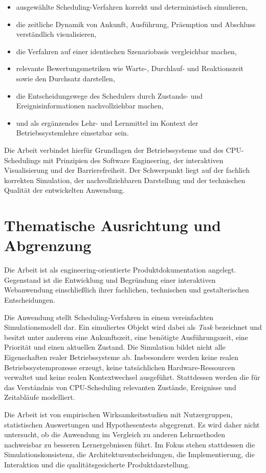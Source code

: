 \begin{itemize}
    \item ausgewählte Scheduling-Verfahren korrekt und deterministisch simulieren,
    \item die zeitliche Dynamik von Ankunft, Ausführung, Präemption und Abschluss verständlich visualisieren,
    \item die Verfahren auf einer identischen Szenariobasis vergleichbar machen,
    \item relevante Bewertungsmetriken wie Warte-, Durchlauf- und Reaktionszeit sowie den Durchsatz darstellen,
    \item die Entscheidungswege des Schedulers durch Zustands- und Ereignisinformationen nachvollziehbar machen,
    \item und als ergänzendes Lehr- und Lernmittel im Kontext der Betriebssystemlehre einsetzbar sein.
\end{itemize}

Die Arbeit verbindet hierfür Grundlagen der Betriebssysteme und des CPU-Schedulings mit Prinzipien des Software Engineering, der interaktiven Visualisierung und der Barrierefreiheit. Der Schwerpunkt liegt auf der fachlich korrekten Simulation, der nachvollziehbaren Darstellung und der technischen Qualität der entwickelten Anwendung.

\section{Thematische Ausrichtung und Abgrenzung}

Die Arbeit ist als engineering-orientierte Produktdokumentation angelegt. Gegenstand ist die Entwicklung und Begründung einer interaktiven Webanwendung einschließlich ihrer fachlichen, technischen und gestalterischen Entscheidungen.

Die Anwendung stellt Scheduling-Verfahren in einem vereinfachten Simulationsmodell dar. Ein simuliertes Objekt wird dabei als \textit{Task} bezeichnet und besitzt unter anderem eine Ankunftszeit, eine benötigte Ausführungszeit, eine Priorität und einen aktuellen Zustand. Die Simulation bildet nicht alle Eigenschaften realer Betriebssysteme ab. Insbesondere werden keine realen Betriebssystemprozesse erzeugt, keine tatsächlichen Hardware-Ressourcen verwaltet und keine realen Kontextwechsel ausgeführt. Stattdessen werden die für das Verständnis von CPU-Scheduling relevanten Zustände, Ereignisse und Zeitabläufe modelliert.

Die Arbeit ist von empirischen Wirksamkeitsstudien mit Nutzergruppen, statistischen Auswertungen und Hypothesentests abgegrenzt. Es wird daher nicht untersucht, ob die Anwendung im Vergleich zu anderen Lehrmethoden nachweisbar zu besseren Lernergebnissen führt. Im Fokus stehen stattdessen die Simulationskonsistenz, die Architekturentscheidungen, die Implementierung, die Interaktion und die qualitätsgesicherte Produktdarstellung.

